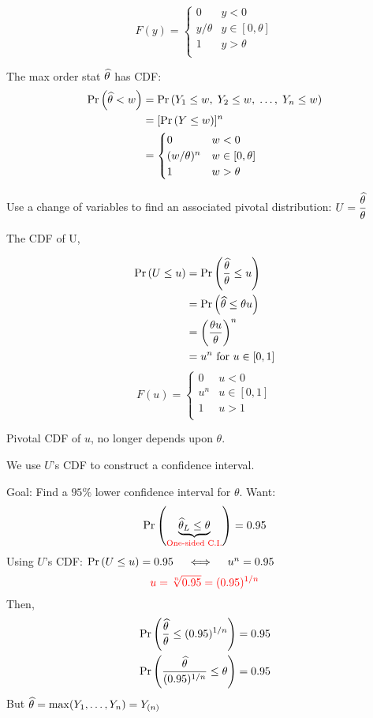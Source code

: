$$F(y) =
\begin{cases} 
      0 & y < 0 \\
      y/\theta & y \in [0, \theta]\\
      1 & y > \theta\\
\end{cases}$$

\nl The max order stat $\widehat{\theta}$ has CDF:
\begin{align}
    \P{\that < w} &= \P{Y_1 \leq w,\; Y_2 \leq w,\; \dots,\; Y_n \leq w} \notag\\
    &= [\P{Y \leq w}]^n \notag\\
    &= \begin{cases} 
        0 & w < 0 \\
        (w/\theta)^n & w \in [0, \theta]\\
        1 & w > \theta\\
    \end{cases} \notag
\end{align}

\nl Use a change of variables to find an associated pivotal distribution: $U = \dfrac{\widehat{\theta}}{\theta}$

\nl The CDF of U,

\begin{align}
       \P{U\leq u} &= \P{\frac{\that}{\theta} \leq u} \notag\\
       &= \P{\that \leq \theta u}\notag\\
       &= \pars{\frac{\theta u}{\theta}}^n \notag\\
       &= u^n \text{ for } u \in [0,1]\notag
\end{align}
$$F(u) = 
\begin{cases} 
      0 & u < 0 \\
      u^n & u \in [0, 1]\\
      1 & u > 1\\
\end{cases}$$

\nl\color{red}Pivotal CDF of $u$, no longer depends upon $\theta$.\color{black}

\nl \color{ggreen} We use $U$'s CDF to construct a confidence interval.\color{black}

\nl Goal: Find a $95\%$ lower confidence interval for $\theta$.
Want:
$$\P{\underbrace{\that_L \leq \theta}_{\text{\color{red}One-sided C.I.}}} = 0.95$$
Using $U$'s CDF: \hspace{0.1in} $\P{U\leq u} = 0.95 \quad \iff \quad u^n = 0.95$
$$\color{red}u = \sqrt[n]{0.95} = (0.95)^{1/n}$$
Then,
\begin{align}
    \P{\frac{\that}{\theta} \leq (0.95)^{1/n} } &= 0.95\notag\\
    \P{\frac{\that}{(0.95)^{1/n}} \leq \theta} &= 0.95\notag
\end{align}
But $\widehat{\theta} = \operatorname{max}(Y_1, \dots, Y_n) = Y_{(n)}$

